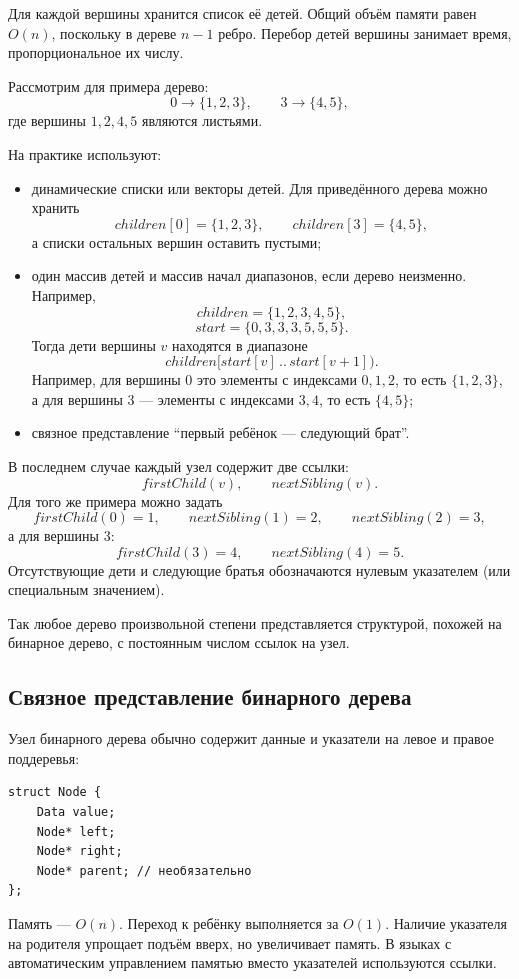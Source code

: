 Для каждой вершины хранится список её детей. Общий объём памяти равен $O(n)$, поскольку в дереве $n-1$ ребро. Перебор детей вершины занимает время, пропорциональное их числу.

Рассмотрим для примера дерево:
\[
0 \to \{1,2,3\}, \qquad 3 \to \{4,5\},
\]
где вершины $1,2,4,5$ являются листьями.

На практике используют:
\begin{itemize}
	\item динамические списки или векторы детей. Для приведённого дерева можно хранить
	\[
	children[0]=\{1,2,3\},\qquad
	children[3]=\{4,5\},
	\]
	а списки остальных вершин оставить пустыми;
	
	\item один массив детей и массив начал диапазонов, если дерево неизменно. Например,
	\[
	children=\{1,2,3,4,5\},
	\]
	\[
	start=\{0,3,3,3,5,5,5\}.
	\]
	Тогда дети вершины $v$ находятся в диапазоне
	\[
	children[start[v]\,..\,start[v+1]).
	\]
	Например, для вершины $0$ это элементы с индексами $0,1,2$, то есть
	$\{1,2,3\}$, а для вершины $3$ --- элементы с индексами $3,4$, то есть
	$\{4,5\}$;
	
	\item связное представление ``первый ребёнок --- следующий брат''.
\end{itemize}

В последнем случае каждый узел содержит две ссылки:
\[
firstChild(v),\qquad nextSibling(v).
\]
Для того же примера можно задать
\[
firstChild(0)=1,\qquad
nextSibling(1)=2,\qquad
nextSibling(2)=3,
\]
а для вершины $3$:
\[
firstChild(3)=4,\qquad
nextSibling(4)=5.
\]
Отсутствующие дети и следующие братья обозначаются нулевым указателем
(или специальным значением).

Так любое дерево произвольной степени представляется структурой, похожей на бинарное дерево, с постоянным числом ссылок на узел.

\subsection{Связное представление бинарного дерева}

Узел бинарного дерева обычно содержит данные и указатели на левое и правое поддеревья:
\begin{verbatim}
struct Node {
    Data value;
    Node* left;
    Node* right;
    Node* parent; // необязательно
};
\end{verbatim}

Память --- $O(n)$. Переход к ребёнку выполняется за $O(1)$. Наличие указателя на родителя упрощает подъём вверх, но увеличивает память. В языках с автоматическим управлением памятью вместо указателей используются ссылки.

